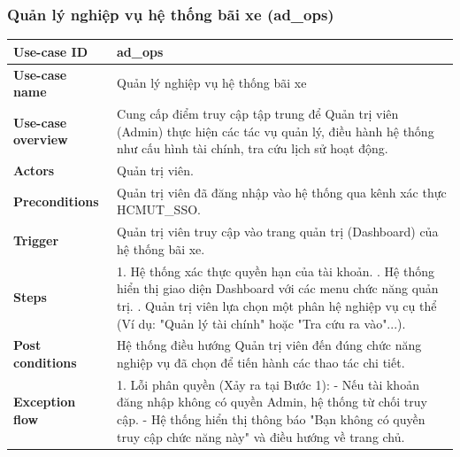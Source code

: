 \subsubsection{Quản lý nghiệp vụ hệ thống bãi xe (ad\_ops)}
\begingroup
\small
\begin{longtable}{|>{\centering\arraybackslash}m{3cm}|m{13.7cm}|}
\hline
\textbf{Use-case ID} & ad\_ops \\ \hline
\textbf{Use-case name} & Quản lý nghiệp vụ hệ thống bãi xe \\ \hline
\textbf{Use-case overview} & Cung cấp điểm truy cập tập trung để Quản trị viên (Admin) thực hiện các tác vụ quản lý, điều hành hệ thống như cấu hình tài chính, tra cứu lịch sử hoạt động. \\ \hline
\textbf{Actors} & Quản trị viên. \\ \hline
\textbf{Preconditions} & Quản trị viên đã đăng nhập vào hệ thống qua kênh xác thực HCMUT\_SSO. \\ \hline
\textbf{Trigger} & Quản trị viên truy cập vào trang quản trị (Dashboard) của hệ thống bãi xe. \\ \hline
\textbf{Steps} & 
1. Hệ thống xác thực quyền hạn của tài khoản. \newline
2. Hệ thống hiển thị giao diện Dashboard với các menu chức năng quản trị. \newline
3. Quản trị viên lựa chọn một phân hệ nghiệp vụ cụ thể (Ví dụ: "Quản lý tài chính" hoặc "Tra cứu ra vào"...). \\ \hline
\textbf{Post conditions} & Hệ thống điều hướng Quản trị viên đến đúng chức năng nghiệp vụ đã chọn để tiến hành các thao tác chi tiết. \\ \hline
\textbf{Exception flow} & 
1. Lỗi phân quyền (Xảy ra tại Bước 1): \newline
- Nếu tài khoản đăng nhập không có quyền Admin, hệ thống từ chối truy cập. \newline
- Hệ thống hiển thị thông báo "Bạn không có quyền truy cập chức năng này" và điều hướng về trang chủ. \\ \hline
\end{longtable}
\endgroup

